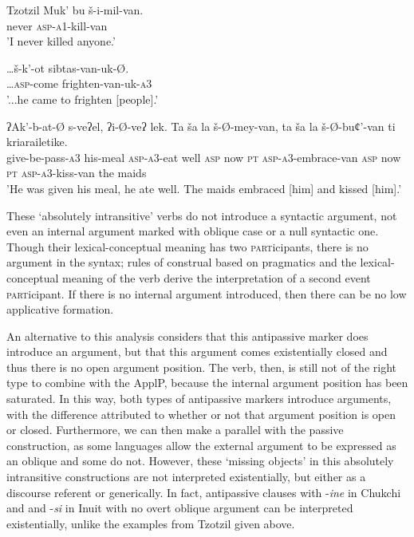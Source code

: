 \documentclass[output=paper,colorlinks,citecolor=brown,nonflat]{./langscibook}
\begin{document}
\ea%
     Tzotzil \citep{Aissen1983} \label{ex:basilico:16}
   \ea \label{ex:basilico:16a}
   \gll Muk’ bu š-i-mil-van.\\
   never \textsc{asp}-\textsc{a1}-kill-van\\
   \glt 'I never killed anyone.'
   
   \ex \label{ex:basilico:16b}
   \gll  …š-k’-ot sibtas-van-uk-Ø.\\
   …\textsc{asp}-come  frighten-van-uk-\textsc{a3}\\
   \glt '...he came to frighten [people].'
   
   \ex \label{ex:basilico:16c}
   \gll  ʔAk’-b-at-Ø s-veʔel, ʔi-Ø-veʔ lek. Ta ša la š-Ø-mey-van, ta ša la š-Ø-buȼ’-van ti kriarailetike. \\
   give-be-pass-\textsc{a3} his-meal \textsc{asp}-\textsc{a3}-eat well  \textsc{asp} now  \textsc{pt} \textsc{asp}-\textsc{a3}-embrace-van \textsc{asp} now \textsc{pt} \textsc{asp}-\textsc{a3}-kiss-van the maids\\
   \glt 'He was given his meal, he ate well. The maids embraced [him] and kissed [him].'
   \z
   \z

These ‘absolutely intransitive’ verbs do not introduce a syntactic argument, not even an internal argument marked with oblique case or a null syntactic one. Though their lexical-conceptual meaning has two \textsc{part}icipants, there is no argument in the syntax; rules of construal based on pragmatics and the lexical-conceptual meaning of the verb derive the interpretation of a second event \textsc{part}icipant. If there is no internal argument introduced, then there can be no low applicative formation. 

An alternative to this analysis considers that this antipassive marker does introduce an argument, but that this argument comes existentially closed and thus there is no open argument position. The verb, then, is still not of the right type to combine with the ApplP, because the internal argument position has been saturated. In this way, both types of antipassive markers introduce arguments, with the difference attributed to whether or not that argument position is open or closed. Furthermore, we can then make a parallel with the passive construction, as some languages allow the external argument to be expressed as an oblique and some do not. However, these ‘missing objects’ in this absolutely intransitive constructions are not interpreted existentially, but either as a discourse referent or generically. In fact, antipassive clauses with -\textit{ine} in Chukchi and and -\textit{si} in Inuit with no overt oblique argument can be interpreted existentially, unlike the examples from Tzotzil given above. 
\end{document}
